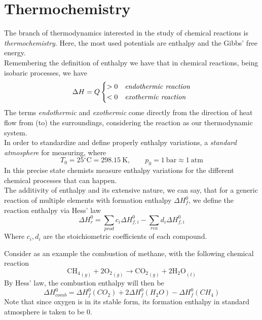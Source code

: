 \documentclass[../qm.tex]{subfiles}
\begin{document}
\section{Thermochemistry}
The branch of thermodynamics interested in the study of chemical reactions is \textit{thermochemistry}. Here, the most used potentials are enthalpy and the Gibbs' free energy.\\
Remembering the definition of enthalpy we have that in chemical reactions, being isobaric processes, we have
\begin{equation}
	\Delta H=Q\begin{dcases}
		>0&\textit{endothermic reaction}\\
		<0&\textit{exothermic reaction}
	\end{dcases}
	\label{eq:enthalpy.chem}
\end{equation}
The terms \emph{endothermic} and \emph{exothermic} come directly from the direction of heat flow from (to) the surroundings, considering the reaction as our thermodynamic system.\\
In order to standardize and define properly enthalpy variations, a \textit{standard atmosphere} for measuring, where
\begin{equation}
	T_0=25\mathrm{^\circ C}=298.15\ \mathrm{K}, \qquad p_0=1\ \mathrm{bar}\approx1\ \mathrm{atm}
	\label{eq:standardatm.chem}
\end{equation}
In this precise state chemists measure enthalpy variations for the different chemical processes that can happen.\\
The additivity of enthalpy and its extensive nature, we can say, that for a generic reaction of multiple elements with formation enthalpy $\Delta H^0_f$, we define the reaction enthalpy via Hess' law
\begin{equation}
	\Delta H^0_r=\sum_{prod}c_i\Delta H^0_{f, i}-\sum_{rea}d_i\Delta H^0_{f, i}
	\label{eq:hesslaw.chem}
\end{equation}
Where $c_i, d_i$ are the stoichiometric coefficients of each compound.\\
\begin{eg}
	Consider as an example the combustion of methane, with the following chemical reaction
	\begin{equation}
		\mathrm{CH_4}_{(g)}+2\mathrm{O_2}_{(g)}\to\mathrm{CO_2}_{(g)}+2\mathrm{H_2O}_{(l)}
		\label{eq:methanecomb.tch}
	\end{equation}
	By Hess' law, the combustion enthalpy will then be
	\begin{equation}
		\Delta H^0_{comb}=\Delta H_f^0\left( CO_2 \right)+2\Delta H_f^0\left( H_2O \right)-\Delta H^0_f\left( CH_4 \right)
		\label{eq:enthalpymethane.tch}
	\end{equation}
	Note that since oxygen is in its stable form, its formation enthalpy in standard atmosphere is taken to be 0.
\end{eg}
\end{document}
